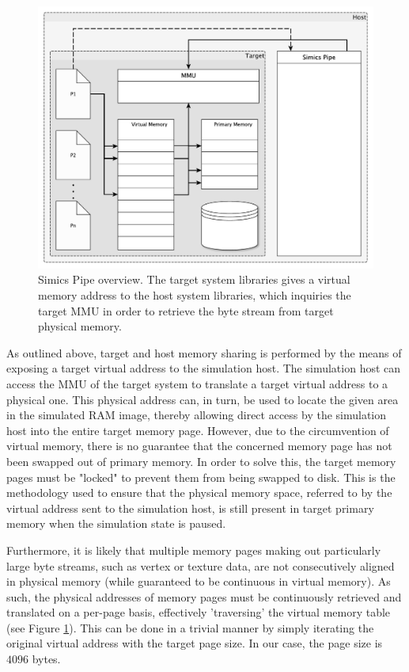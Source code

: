\begin{figure}
\centering
\includegraphics[width=\linewidth]{img/yedvirtualmemory.pdf}
\caption{Simics Pipe overview. The target system libraries gives a virtual memory address to the host system libraries, which inquiries the target MMU in order to retrieve the byte stream from target physical memory.}
\label{fig:virtualmemory}
\end{figure}

As outlined above, target and host memory sharing is performed by the means of exposing a target virtual address to the simulation host.
The simulation host can access the MMU of the target system to translate a target virtual address to a physical one.
This physical address can, in turn, be used to locate the given area in the simulated RAM image, thereby allowing direct access by the simulation host into the entire target memory page.
However, due to the circumvention of virtual memory, there is no guarantee that the concerned memory page has not been swapped out of primary memory.
In order to solve this, the target memory pages must be "locked" to prevent them from being swapped to disk.
This is the methodology used to ensure that the physical memory space, referred to by the virtual address sent to the simulation host, is still present in target primary memory when the simulation state is paused.

Furthermore, it is likely that multiple memory pages making out particularly large byte streams, such as vertex or texture data, are not consecutively aligned in physical memory (while guaranteed to be continuous in virtual memory).
As such, the physical addresses of memory pages must be continuously retrieved and translated on a per-page basis, effectively 'traversing' the virtual memory table (see Figure \ref{fig:virtualmemory}).
This can be done in a trivial manner by simply iterating the original virtual address with the target page size.
In our case, the page size is $4096$ bytes.


